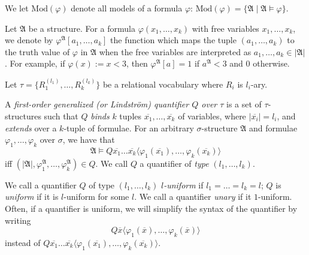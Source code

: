 \documentclass[a4paper,UKenglish,cleveref, autoref, thm-restate, anonymous]{lipics-v2021}
\begin{document}
\begin{remark}
    We let $\text{Mod}(\varphi)$ denote all models of a formula $\varphi$: \( \text{Mod}(\varphi) = \{\mathfrak{A} \mid \mathfrak{A} \models \varphi\}.\)
\end{remark}

\begin{remark}
    Let $\mathfrak{A}$ be a structure. For a formula $\varphi(x_1, \dots, x_k)$ with free variables $x_1, \dots, x_k$, we denote by $\varphi^\mathfrak{A}[a_1, \dots, a_k]$ the function which maps the tuple $(a_1, \dots, a_k)$ to the truth value of $\varphi$ in $\mathfrak{A}$ when the free variables are interpreted as $a_1, \dots, a_k \in |\mathfrak{A}|$. For example, if $\varphi(x) := x < 3$, then $\varphi^\mathfrak{A}[a] = 1$ if $a^\mathfrak{A} < 3$ and $0$ otherwise.
\end{remark}

\iffalse


\begin{definition}\label{def:lindstrom}
    Let $\tau = \{R_1^{(l_1)}, \dots, R_k^{(l_k)}\}$ be a relational vocabulary where $R_i$ is $l_i$-ary. 
    
    A \emph{first-order generalized (or Lindstr{\"o}m) quantifier $Q$ over $\tau$} is a set of $\tau$-structures such that $Q$ \emph{binds} $k$ tuples $\overline{x_1},\dots,\overline{x_k}$ of variables, where $|\overline{x_i}| = l_i$, and \emph{extends} over a $k$-tuple of formulae. For an arbitrary $\sigma$-structure $\mathfrak{A}$ and formulae $\varphi_1, \dots, \varphi_k$ over $\sigma$, we have that \[
        \mathfrak{A} \models Q\overline{x_1}\dots\overline{x_k}\langle \varphi_1(\overline{x_1}), \dots, \varphi_k(\overline{x_k})\rangle
    \] iff $(|\mathfrak{A}|, \varphi_1^\mathfrak{A}, \dots, \varphi_k^\mathfrak{A}) \in Q$. We call $Q$ a quantifier of \emph{type} $(l_1, \dots, l_k)$.

    We call a quantifier $Q$ of type $(l_1, \dots, l_k)$ \emph{$l$-uniform} if $l_1 = \dots = l_k = l$; $Q$ is \emph{uniform} if it is $l$-uniform for some $l$. We call a quantifier \emph{unary} if it $1$-uniform. Often, if a quantifier is uniform, we will simplify the syntax of the quantifier by writing \[Q\overline{x}\langle \varphi_1(\overline{x}), \dots, \varphi_k(\overline{x})\rangle\] instead of $Q\overline{x_1}\dots\overline{x_k}\langle \varphi_1(\overline{x_1}), \dots, \varphi_k(\overline{x_k})\rangle$.
    
\end{definition}
\end{document}
